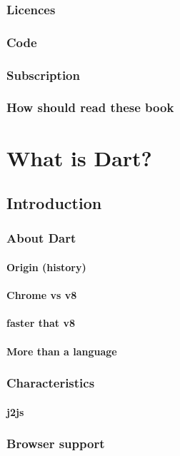 \documentclass[10pt]{book}
\begin{document}
\section{Licences}
\lipsum[3]
\section{Code}
\lipsum[4]
\section{Subscription}
\lipsum[5]
\section{How should read these book}
\lipsum[6]
%
\tableofcontents
%
\mainmatter
%
\part{What is Dart?}
\chapter{Introduction}
\lipsum[7]
\section{About Dart}
\lipsum[8]
\subsection{Origin  (history)}
\lipsum[9]
\subsection{Chrome vs v8}
\lipsum[10]
\subsection{faster that v8}
\lipsum[11]
\subsection{More than a language}
\lipsum[11]
\section{Characteristics}
\lipsum[12]
\subsection{j2js}
\lipsum[13]
\section{Browser support}
\lipsum[14]
\end{document}
